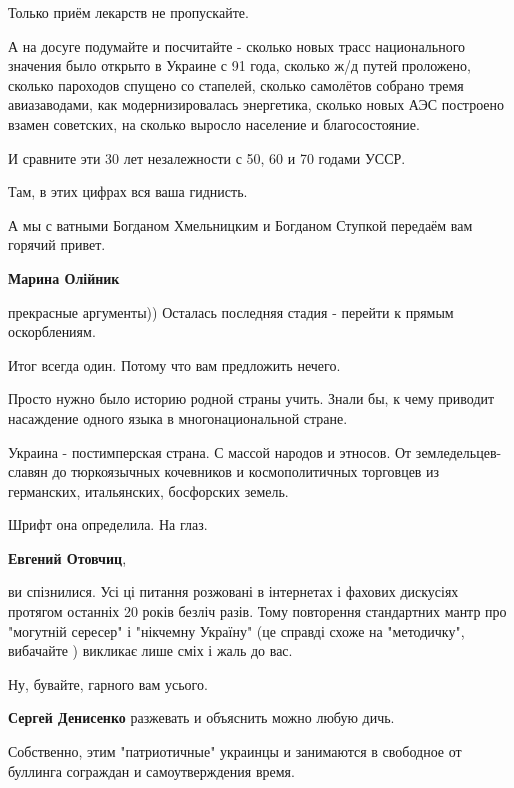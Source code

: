 \begin{itemize}
\begin{itemize}
Только приём лекарств не пропускайте.

А на досуге подумайте и посчитайте - сколько новых трасс национального значения
было открыто в Украине с 91 года, сколько ж/д путей проложено, сколько
пароходов спущено со стапелей, сколько самолётов собрано тремя авиазаводами,
как модернизировалась энергетика, сколько новых АЭС построено взамен советских,
на сколько выросло население и благосостояние.

И сравните эти 30 лет незалежности с 50, 60 и 70 годами УССР.

Там, в этих цифрах вся ваша гиднисть.

А мы с ватными Богданом Хмельницким и Богданом Ступкой передаём вам горячий
привет.


\textbf{Марина Олійник} 

прекрасные аргументы)) Осталась последняя стадия - перейти к прямым
оскорблениям.

Итог всегда один. Потому что вам предложить нечего.

Просто нужно было историю родной страны учить. Знали бы, к чему приводит
насаждение одного языка в многонациональной стране.

Украина - постимперская страна. С массой народов и этносов. От
земледельцев-славян до тюркоязычных кочевников и космополитичных торговцев из
германских, итальянских, босфорских земель.

Шрифт она определила. На глаз.


\textbf{Евгений Отовчиц}, 

ви спізнилися. Усі ці питання розжовані в інтернетах і фахових дискусіях
протягом останніх 20 років безліч разів. Тому повторення стандартних мантр про
"могутній сересер" і "нікчемну Україну" (це справді схоже на "методичку",
вибачайте \Laughey[1.0][white] ) викликає лише сміх і жаль до вас.

Ну, бувайте, гарного вам усього.



\textbf{Сергей Денисенко} разжевать и объяснить можно любую дичь.

Собственно, этим "патриотичные" украинцы и занимаются в свободное от буллинга сограждан и самоутверждения время.


\end{itemize}
\end{itemize}
